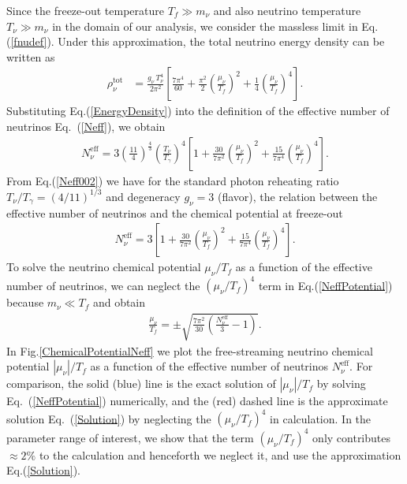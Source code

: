 Since the freeze-out temperature $T_f\gg m_\nu$ and also neutrino temperature $T_\nu\gg m_\nu$ in the domain of our analysis, we consider the massless limit in Eq.\;(\ref{fnudef}). Under this approximation, the total neutrino energy density can be written as
\begin{align}
\label{EnergyDensity}
\rho_\nu^{\mathrm{tot}}
&=\frac{g_\nu\,T_\nu^4}{2\pi^2}\left[\frac{7\pi^4}{60}+\frac{\pi^2}{2}\left(\frac{\mu_\nu}{T_f}\right)^{\!\!2}+\frac{1}{4}\left(\frac{\mu_\nu}{T_f}\right)^{\!\!4}\right].
\end{align}
Substituting Eq.\;(\ref{EnergyDensity}) into the definition of the effective number of neutrinos Eq.~(\ref{Neff}), we obtain 
\begin{align}
\label{Neff002}
N_\nu^{\mathrm{eff}}\!\!
=\!3\!\left(\frac{11}{4}\right)^{\!\!\frac{4}{3}}\!\!\left(\frac{T_\nu}{T_\gamma}\right)^{\!\!4}\!
\left[1\!+\!\frac{30}{7\pi^2}\!\!\left(\frac{\mu_\nu}{T_f}\right)^{\!\!2} 
\!\!+\frac{15}{7\pi^4}\!\!\left(\frac{\mu_\nu}{T_f}\right)^{\!\!4}\right].
\end{align}
From Eq.\;(\ref{Neff002}) we have for the standard photon reheating ratio $T_\nu/T_\gamma=(4/11)^{1/3}$ \cite{Kolb:1990vq} and degeneracy $g_\nu=3$ (flavor), the relation between the effective number of neutrinos and the chemical potential at freeze-out
\begin{align}
\label{NeffPotential}
N_\nu^{\mathrm{eff}}=3\left[1+\frac{30}{7\pi^2}\left(\frac{\mu_\nu}{T_f}\right)^{\!\!2}+ \frac{15}{7\pi^4} \left(\frac{\mu_\nu}{T_f}\right)^{\!\!4}\right].
\end{align}
To solve the neutrino chemical potential $\mu_\nu/T_f$ as a function of the effective number of neutrinos, we can neglect the $(\mu_\nu/T_f)^4$ term in Eq.\;(\ref{NeffPotential}) because $m_\nu\ll T_f$ and obtain
\begin{align}\label{Solution}
\frac{\mu_\nu}{T_f}=\pm\sqrt{\frac{7\pi^2}{30}\left(\frac{N_\nu^{\mathrm{eff}}}{3}-1\right)}.
\end{align}
In Fig.\;\ref{ChemicalPotentialNeff} we plot the free-streaming neutrino chemical potential $|\mu_\nu|/T_f$ as a function of the effective number of neutrinos $N_\nu^{\mathrm{eff}}$. For comparison, the solid (blue) line is the exact solution of $|\mu_\nu|/T_f$ by solving Eq.~(\ref{NeffPotential}) numerically, and the (red) dashed line is the approximate solution Eq.~(\ref{Solution}) by neglecting the $(\mu_\nu/T_f)^4$ in calculation. In the parameter range of interest, we show that the term $(\mu_\nu/T_f)^4$ only contributes $\approx 2\%$ to the calculation and henceforth we neglect it, and use the approximation Eq.\;(\ref{Solution}). 


